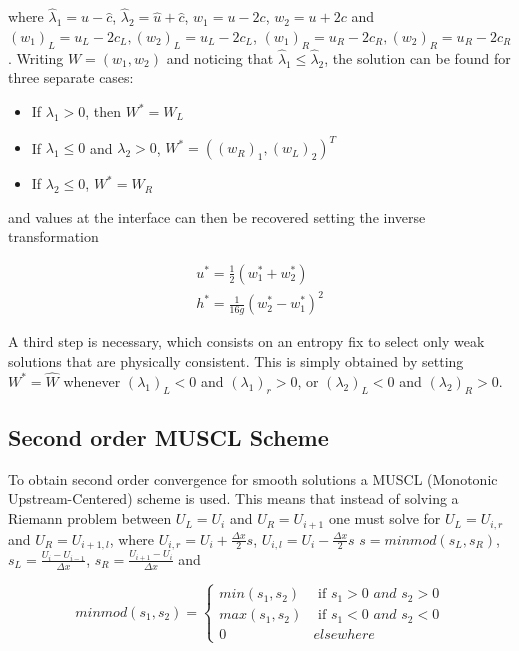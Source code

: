  where $\hat \lambda_1 = \hat u - \hat c$, $\hat \lambda_2 = \hat u + \hat c$, $w_1 = u-2c$, $w_2 = u+2c$ and $ (w_1)_L = u_L - 2c_L, (w_2)_L = u_L - 2c_L$, $ (w_1)_R = u_R - 2c_R, (w_2)_R = u_R - 2c_R$. Writing $W=(w_1,w_2)$ and noticing that $\hat \lambda_1 \leq \hat \lambda_2$, the solution can be found for three separate cases:

\begin{itemize}
	\item If $\lambda_1 > 0$, then $W^* = W_L$
	\item If $\lambda_1 \leq 0 $ and $\lambda_2>0$, $W^* = ((w_R)_1, (w_L)_2)^T$
	\item If $\lambda_2\leq 0 $, $W^* = W_R$
\end{itemize}

 and values at the interface can then be recovered setting the inverse transformation 

\begin{equation}
	\begin{split}
	u^* = \frac{1}{2}(w^*_1+w^*_2) \\
	h^* = \frac{1}{16g}(w^*_2-w^*_1)^2
	\end{split}	
	\label{serre:riemman_solution}
\end{equation}

A third step is necessary, which consists on an entropy fix to select only weak solutions that are physically consistent. This is simply obtained by setting $W^* = \hat W$ whenever $(\lambda_1)_L < 0$ and $(\lambda_1)_r >0$, or $(\lambda_2)_L < 0 $ and $(\lambda_2)_R>0$.

\subsection{Second order MUSCL Scheme}

To obtain second order convergence for smooth solutions a MUSCL (Monotonic Upstream-Centered) scheme is used. This means that instead of solving a Riemann problem between $U_L=U_{i}$ and $U_R=U_{i+1}$ one must solve for 
$U_L = U_{i,r}$ and $U_R=U_{i+1,l}$, 
where $U_{i,r} = U_i + \frac{\Delta x}{2} s$, 
$U_{i,l} = U_i - \frac{\Delta x}{2} s$  $s = minmod(s_L,s_R)$, 
$s_L = \frac{U_{i}-U_{i-1}}{\Delta x}$, 
$s_R = \frac{U_{i+1}-U_{i}}{\Delta x}$ and

\begin{equation}
	minmod(s_1,s_2) = \begin{cases}
		min(s_1,s_2) & \text{ if } s_1>0 \textit{ and } s_2>0 \\
		max(s_1,s_2) & \text{ if } s_1<0 \textit{ and } s_2<0 \\
		0 & elsewhere
	\end{cases}
\end{equation}

